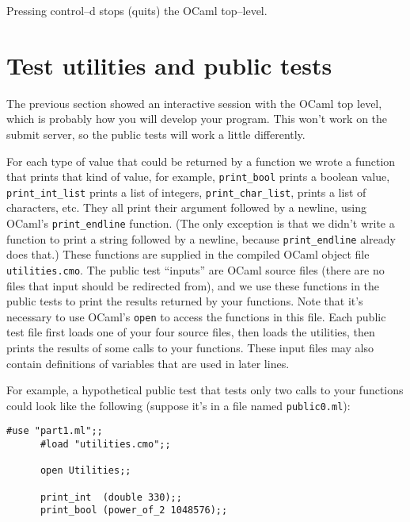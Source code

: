 \documentclass[11pt]{article}
\begin{document}
    Pressing control--d stops (quits) the OCaml top--level.

  \section{Test utilities and public tests}

    The previous section showed an interactive session with the OCaml top
  level, which is probably how you will develop your program.  This won't
  work on the submit server, so the public tests will work a little
  differently.

    For each type of value that could be returned by a function we wrote a
  function that prints that kind of value, for example, \texttt{print\_bool}
  prints a boolean value, \texttt{print\_int\_list} prints a list of
  integers, \texttt{print\_char\_list}, prints a list of characters, etc.
  They all print their argument followed by a newline, using OCaml's
  \texttt{print\_endline} function.  (The only exception is that we didn't
  write a function to print a string followed by a newline, because
  \texttt{print\_endline} already does that.)  These functions are supplied
  in the compiled OCaml object file \texttt{utilities.cmo}.  The public test
  ``inputs'' are OCaml source files (there are no files that input should be
  redirected from), and we use these functions in the public tests to print
  the results returned by your functions.  Note that it's necessary to use
  OCaml's \texttt{open} to access the functions in this file.  Each public
  test file first loads one of your four source files, then loads the
  utilities, then prints the results of some calls to your functions.  These
  input files may also contain definitions of variables that are used in
  later lines.

    For example, a hypothetical public test that tests only two calls to your
  functions could look like the following (suppose it's in a file named
  \texttt{public0.ml}):

    \enlargethispage{3mm}

    \vspace{-1mm}

    \begin{center}

      \begin{BVerbatim}[gobble=6]
      #use "part1.ml";;
      #load "utilities.cmo";;

      open Utilities;;

      print_int  (double 330);;
      print_bool (power_of_2 1048576);;
      \end{BVerbatim}

    \end{center}
\end{document}
